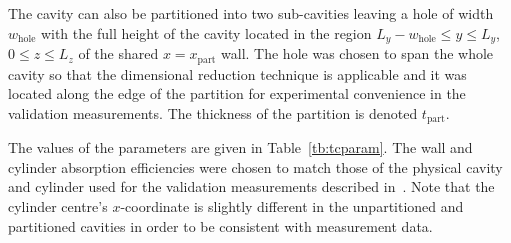 \documentclass[a4paper]{article}
\numberwithin{equation}{section}
\newcounter{Table}
\begin{document}
The cavity can also be partitioned into two sub-cavities leaving a hole of width
$w_\mathrm{hole}$ with the full height of the cavity located in the region 
$L_y-w_\mathrm{hole} \leq y \leq L_y$, $0 \leq z \leq L_z$ of the shared 
$x=x_\mathrm{part}$ wall. The hole was chosen to span the whole cavity so that the 
dimensional reduction technique is applicable and it was located along the edge of the 
partition for experimental convenience in the validation measurements.
The thickness of the partition is denoted $t_\mathrm{part}$.

The values of the parameters are given in Table~\ref{tb:tcparam}. The wall and cylinder
absorption efficiencies were chosen to match those of the physical cavity and
cylinder used for the validation measurements described in~\citep{Flintoft2017b}.
Note that the cylinder centre's $x$-coordinate is slightly different in the unpartitioned
and partitioned cavities in order to be consistent with measurement data. 
\end{document}
